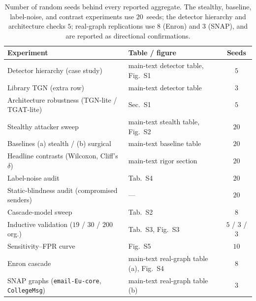 \documentclass[a4paper,11pt]{article}
\begin{document}
\begin{table}[h]\centering\small
\begin{tabular}{llc}
\toprule
Experiment & Table / figure & Seeds \\
\midrule
Detector hierarchy (case study) & main-text detector table, Fig.~S1 & $5$ \\
Library TGN (extra row) & main-text detector table & $3$ \\
Architecture robustness (TGN-lite / TGAT-lite) & Sec.~S1 & $5$ \\
Stealthy attacker sweep & main-text stealth table, Fig.~S2 & $20$ \\
Baselines (a) stealth / (b) surgical & main-text baseline table & $20$ \\
Headline contrasts (Wilcoxon, Cliff's $\delta$) & main-text rigor section & $20$ \\
Label-noise audit & Tab.~S4 & $20$ \\
Static-blindness audit (compromised senders) & --- & $20$ \\
Cascade-model sweep & Tab.~S2 & $8$ \\
Inductive validation ($19$ / $30$ / $200$ org.) & Tab.~S3, Fig.~S3 & $5$ / $3$ / $3$ \\
Sensitivity--FPR curve & Fig.~S5 & $10$ \\
Enron cascade & main-text real-graph table (a), Fig.~S4 & $8$ \\
SNAP graphs (\texttt{email-Eu-core}, \texttt{CollegeMsg}) & main-text real-graph table (b) & $3$ \\
\bottomrule
\end{tabular}
\caption{Number of random seeds behind every reported aggregate. The stealthy, baseline,
label-noise, and contrast experiments use $20$~seeds; the detector hierarchy and architecture checks
$5$; real-graph replications use $8$ (Enron) and $3$ (SNAP), and are reported as directional
confirmations.}
\label{stab:seeds}
\end{table}
\end{document}
